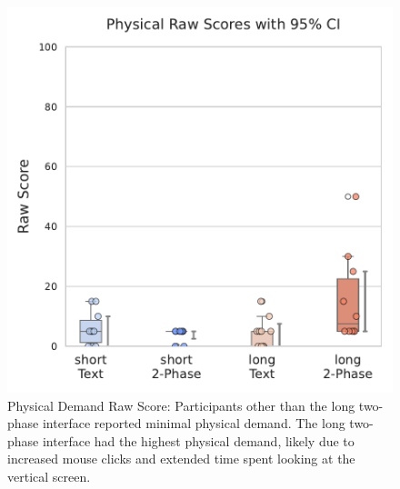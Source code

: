 
\begin{figure}[h]
    \begin{minipage}[t]{0.45\textwidth}
        \centering
        \includegraphics[width=\textwidth, trim=0 13 0 13, clip]{content/image/cog/Physical_scores.pdf}
        \captionsetup{width=0.9\textwidth, justification=justified}
        \caption{Physical Demand Raw Score: Participants other than the long two-phase interface reported minimal physical demand. The long two-phase interface had the highest physical demand, likely due to increased mouse clicks and extended time spent looking at the vertical screen.}
        \label{fig:physical_cog_score}
    \end{minipage}
    \hfill
    \begin{minipage}[t]{0.45\textwidth}
        \centering

\end{minipage}
\end{figure}
